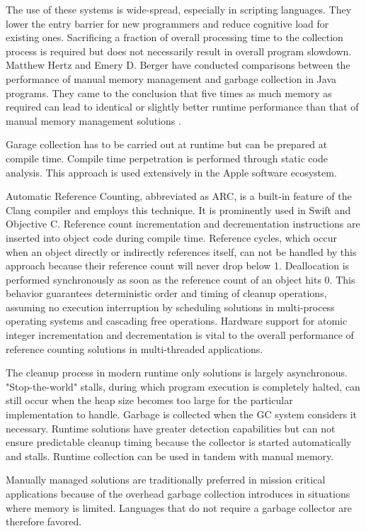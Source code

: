 The use of these systems is wide-spread, especially in scripting languages. They lower the entry barrier for new programmers and reduce cognitive load for existing ones. Sacrificing a fraction of overall processing time to the collection process is required but does not necessarily result in overall program slowdown. Matthew Hertz and Emery D. Berger have conducted comparisons between the performance of manual memory management and garbage collection in Java programs. They came to the conclusion that five times as much memory as required can lead to identical or slightly better runtime performance than that of manual memory management solutions \cite{garbage-collection-vs-manual}. 

Garage collection has to be carried out at runtime but can be prepared at compile time. Compile time perpetration is performed through static code analysis. This approach is used extensively in the Apple software ecosystem. 

Automatic Reference Counting, abbreviated as ARC, is a built-in feature of the Clang compiler and employs this technique. It is prominently used in Swift and Objective C. Reference count incrementation and decrementation instructions are inserted into object code during compile time. Reference cycles, which occur when an object directly or indirectly references itself, can not be handled by this approach because their reference count will never drop below 1. Deallocation is performed synchronously as soon as the reference count of an object hits 0. This behavior guarantees deterministic order and timing of cleanup operations, assuming no execution interruption by scheduling solutions in multi-process operating systems and cascading free operations. Hardware support for atomic integer incrementation and decrementation is vital to the overall performance of reference counting solutions in multi-threaded applications.

The cleanup process in modern runtime only solutions is largely asynchronous. "Stop-the-world" stalls, during which program execution is completely halted, can still occur when the heap size becomes too large for the particular implementation to handle. Garbage is collected when the GC system considers it necessary. Runtime solutions have greater detection capabilities but can not ensure predictable cleanup timing because the collector is started automatically and stalls. Runtime collection can be used in tandem with manual memory.

Manually managed solutions are traditionally preferred in mission critical applications because of the overhead garbage collection introduces in situations where memory is limited. Languages that do not require a garbage collector are therefore favored.

